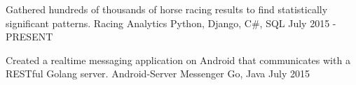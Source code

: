 

\begin{cventries}

  \cvsimpleentry
    {Gathered hundreds of thousands of horse racing results to find statistically significant patterns.} %
    {Racing Analytics} %
    {Python, Django, C\#, SQL} %
    {July 2015 - PRESENT} %

  \cvsimpleentry
    {Created a realtime messaging application on Android that communicates with a RESTful Golang server.} %
    {Android-Server Messenger} %
    {Go, Java} %
    {July 2015} %

\end{cventries}
